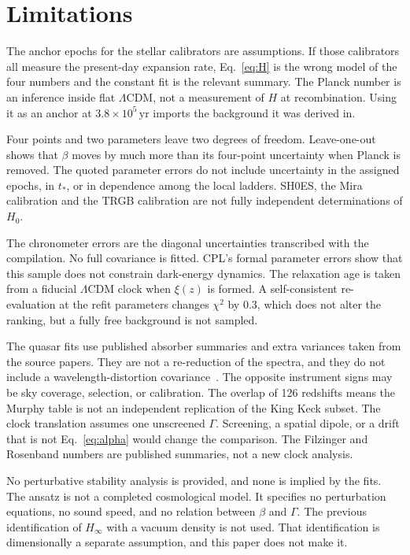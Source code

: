 \section{Limitations}
\label{sec:limits}

The anchor epochs for the stellar calibrators are assumptions.
If those calibrators all measure the present-day expansion rate, Eq.~\eqref{eq:H} is the wrong model of the four numbers and the constant fit is the relevant summary.
The Planck number is an inference inside flat $\Lambda$CDM, not a measurement of $H$ at recombination.
Using it as an anchor at $3.8\times10^{5}\,\mathrm{yr}$ imports the background it was derived in.

Four points and two parameters leave two degrees of freedom.
Leave-one-out shows that $\beta$ moves by much more than its four-point uncertainty when Planck is removed.
The quoted parameter errors do not include uncertainty in the assigned epochs, in $t_{*}$, or in dependence among the local ladders.
SH0ES, the Mira calibration and the TRGB calibration are not fully independent determinations of $H_{0}$.

The chronometer errors are the diagonal uncertainties transcribed with the compilation.
No full covariance is fitted.
CPL's formal parameter errors show that this sample does not constrain dark-energy dynamics.
The relaxation age is taken from a fiducial $\Lambda$CDM clock when $\xi(z)$ is formed.
A self-consistent re-evaluation at the refit parameters changes $\chi^{2}$ by $0.3$, which does not alter the ranking, but a fully free background is not sampled.

The quasar fits use published absorber summaries and extra variances taken from the source papers.
They are not a re-reduction of the spectra, and they do not include a wavelength-distortion covariance~\citep{Whitmore2015}.
The opposite instrument signs may be sky coverage, selection, or calibration.
The overlap of 126 redshifts means the Murphy table is not an independent replication of the King Keck subset.
The clock translation assumes one unscreened $\Gamma$.
Screening, a spatial dipole, or a drift that is not Eq.~\eqref{eq:alpha} would change the comparison.
The Filzinger and Rosenband numbers are published summaries, not a new clock analysis.

No perturbative stability analysis is provided, and none is implied by the fits.
The ansatz is not a completed cosmological model.
It specifies no perturbation equations, no sound speed, and no relation between $\beta$ and $\Gamma$.
The previous identification of $H_{\infty}$ with a vacuum density is not used.
That identification is dimensionally a separate assumption, and this paper does not make it.
